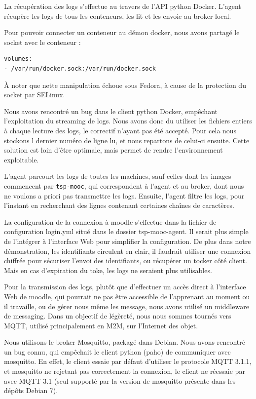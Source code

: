 \documentclass[a4paper,11pt]{report}
\begin{document}
La récupération des logs s'effectue au travers de l'API python Docker\cite{docker-py}.
L'agent récupère les logs de tous les conteneurs, les lit et les envoie au broker local.

Pour pouvoir connecter un conteneur au démon docker, nous avons partagé le socket avec le conteneur :

\begin{lstlisting}[language=Bash,caption={Extrait de la configuration fig}]
volumes:
- /var/run/docker.sock:/var/run/docker.sock
\end{lstlisting}

À noter que nette manipulation échoue sous Fedora, à cause de la protection du socket par SELinux.

Nous avons rencontré un bug\cite{dockerpybug} dans le client python Docker, empêchant l'exploitation du streaming de logs. Nous avons donc du utiliser les fichiers entiers à chaque lecture des logs, le correctif n'ayant pas été accepté. Pour cela nous stockons l dernier numéro de ligne lu, et nous repartons de celui-ci ensuite. Cette solution est loin d'être optimale, mais permet de rendre l'environnement exploitable.

L'agent parcourt les logs de toutes les machines, sauf celles dont les images commencent par \texttt{tsp-mooc}, qui correspondent à l'agent et au broker, dont nous ne voulons a priori pas transmettre les logs. Ensuite, l'agent filtre les logs, pour l'instant en recherchant des lignes contenant certaines chaînes de caractères.

La configuration de la connexion à moodle s'effectue dans la fichier de configuration login.yml situé dans le dossier tsp-mooc-agent. Il serait plus simple de l'intégrer à l'interface Web pour simplifier la configuration. De plus dans notre démonstration, les identifiants circulent en clair, il faudrait utiliser une connexion chiffrée pour sécuriser l'envoi des identifiants, ou récupérer un tocker côté client. Mais en cas d'expiration du toke, les logs ne seraient plus utilisables.

Pour la transmission des logs, plutôt que d'effectuer un accès direct à l'interface Web de moodle, qui pourrait ne pas être accessible de l'apprenant au moment ou il travaille, ou de gérer nous même les message, nous avons utilisé un middleware de messaging. Dans un objectif de légèreté, nous nous sommes tournés vers MQTT, utilisé principalement en M2M, sur l'Internet des objet.

Nous utilisons le broker Mosquitto\cite{mosquitto}, packagé dans Debian. Nous avons rencontré un bug connu\cite{bug-mosquitto}, qui empêchait le client python (paho) de communiquer avec mosquitto. En effet, le client essaie par défaut d'utiliser le protocole MQTT 3.1.1, et mosquitto ne rejetant pas correctement la connexion, le client ne réessaie par avec MQTT 3.1 (seul supporté par la version de mosquitto présente dans les dépôts Debian 7).
\end{document}

